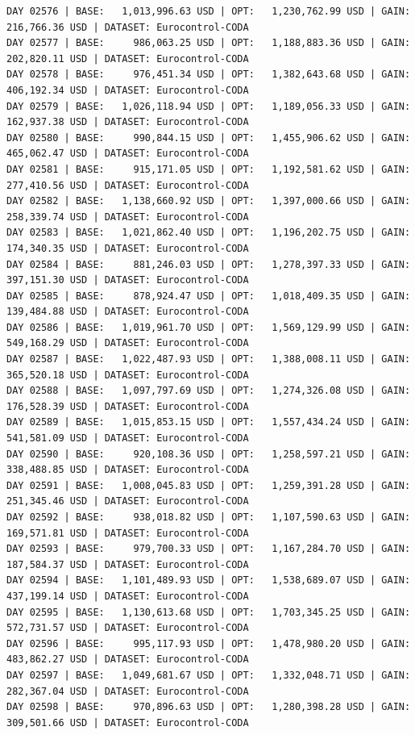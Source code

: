 \documentclass[11pt,a4paper]{article}
\begin{document}
\begin{verbatim}
DAY 02576 | BASE:   1,013,996.63 USD | OPT:   1,230,762.99 USD | GAIN: 216,766.36 USD | DATASET: Eurocontrol-CODA
DAY 02577 | BASE:     986,063.25 USD | OPT:   1,188,883.36 USD | GAIN: 202,820.11 USD | DATASET: Eurocontrol-CODA
DAY 02578 | BASE:     976,451.34 USD | OPT:   1,382,643.68 USD | GAIN: 406,192.34 USD | DATASET: Eurocontrol-CODA
DAY 02579 | BASE:   1,026,118.94 USD | OPT:   1,189,056.33 USD | GAIN: 162,937.38 USD | DATASET: Eurocontrol-CODA
DAY 02580 | BASE:     990,844.15 USD | OPT:   1,455,906.62 USD | GAIN: 465,062.47 USD | DATASET: Eurocontrol-CODA
DAY 02581 | BASE:     915,171.05 USD | OPT:   1,192,581.62 USD | GAIN: 277,410.56 USD | DATASET: Eurocontrol-CODA
DAY 02582 | BASE:   1,138,660.92 USD | OPT:   1,397,000.66 USD | GAIN: 258,339.74 USD | DATASET: Eurocontrol-CODA
DAY 02583 | BASE:   1,021,862.40 USD | OPT:   1,196,202.75 USD | GAIN: 174,340.35 USD | DATASET: Eurocontrol-CODA
DAY 02584 | BASE:     881,246.03 USD | OPT:   1,278,397.33 USD | GAIN: 397,151.30 USD | DATASET: Eurocontrol-CODA
DAY 02585 | BASE:     878,924.47 USD | OPT:   1,018,409.35 USD | GAIN: 139,484.88 USD | DATASET: Eurocontrol-CODA
DAY 02586 | BASE:   1,019,961.70 USD | OPT:   1,569,129.99 USD | GAIN: 549,168.29 USD | DATASET: Eurocontrol-CODA
DAY 02587 | BASE:   1,022,487.93 USD | OPT:   1,388,008.11 USD | GAIN: 365,520.18 USD | DATASET: Eurocontrol-CODA
DAY 02588 | BASE:   1,097,797.69 USD | OPT:   1,274,326.08 USD | GAIN: 176,528.39 USD | DATASET: Eurocontrol-CODA
DAY 02589 | BASE:   1,015,853.15 USD | OPT:   1,557,434.24 USD | GAIN: 541,581.09 USD | DATASET: Eurocontrol-CODA
DAY 02590 | BASE:     920,108.36 USD | OPT:   1,258,597.21 USD | GAIN: 338,488.85 USD | DATASET: Eurocontrol-CODA
DAY 02591 | BASE:   1,008,045.83 USD | OPT:   1,259,391.28 USD | GAIN: 251,345.46 USD | DATASET: Eurocontrol-CODA
DAY 02592 | BASE:     938,018.82 USD | OPT:   1,107,590.63 USD | GAIN: 169,571.81 USD | DATASET: Eurocontrol-CODA
DAY 02593 | BASE:     979,700.33 USD | OPT:   1,167,284.70 USD | GAIN: 187,584.37 USD | DATASET: Eurocontrol-CODA
DAY 02594 | BASE:   1,101,489.93 USD | OPT:   1,538,689.07 USD | GAIN: 437,199.14 USD | DATASET: Eurocontrol-CODA
DAY 02595 | BASE:   1,130,613.68 USD | OPT:   1,703,345.25 USD | GAIN: 572,731.57 USD | DATASET: Eurocontrol-CODA
DAY 02596 | BASE:     995,117.93 USD | OPT:   1,478,980.20 USD | GAIN: 483,862.27 USD | DATASET: Eurocontrol-CODA
DAY 02597 | BASE:   1,049,681.67 USD | OPT:   1,332,048.71 USD | GAIN: 282,367.04 USD | DATASET: Eurocontrol-CODA
DAY 02598 | BASE:     970,896.63 USD | OPT:   1,280,398.28 USD | GAIN: 309,501.66 USD | DATASET: Eurocontrol-CODA

\end{verbatim}
\end{document}
